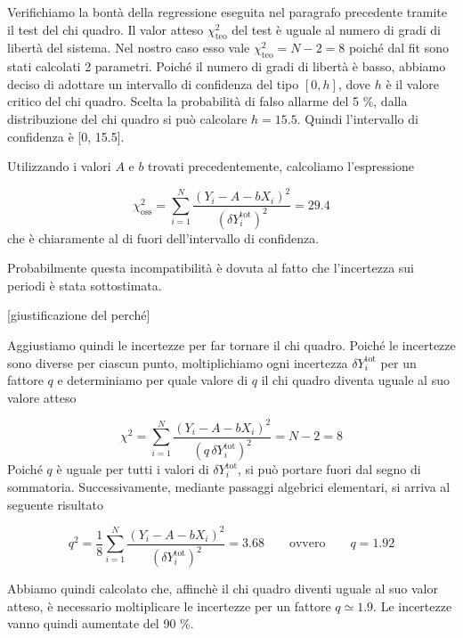 Verifichiamo la bontà della regressione eseguita nel paragrafo precedente tramite il test del chi quadro.
Il valor atteso $\chi^2_{\text{teo}}$ del test è uguale al numero di gradi di libertà del sistema. Nel nostro caso
esso vale $\chi^2_{\text{teo}} = N - 2 = 8$ poiché dal fit sono stati calcolati 2 parametri. Poiché
il numero di gradi di libertà è basso, abbiamo deciso di adottare un intervallo di confidenza del tipo $[0, h]$,
dove $h$ è il valore critico del chi quadro. Scelta la probabilità di falso allarme del 5 \%, dalla distribuzione
del chi quadro si può calcolare $h = 15.5$. Quindi l'intervallo di confidenza è [0, 15.5]. 

Utilizzando i valori $A$ e $b$ trovati precedentemente, calcoliamo l'espressione

\begin{equation}
    \chi^2_{\text{oss}} = \sum_{i=1}^N \frac{(Y_i - A - bX_i)^2}{(\delta Y_i^{\text{tot}})^2} = 29.4
\end{equation}
%
che è chiaramente al di fuori dell'intervallo di confidenza.

Probabilmente questa incompatibilità è dovuta al fatto che l'incertezza sui periodi è stata sottostimata.

[giustificazione del perché]

Aggiustiamo quindi le incertezze per far tornare il chi quadro. Poiché le incertezze sono diverse per ciascun punto,
moltiplichiamo ogni incertezza $\delta Y_i^{\text{tot}}$ per un fattore $q$ e determiniamo per quale valore di $q$
il chi quadro diventa uguale al suo valore atteso

\begin{equation}
    \chi^2 = \sum_{i=1}^N \frac{(Y_i - A - bX_i)^2}{(q\, \delta Y_i^{\text{tot}})^2} = N - 2 = 8
\end{equation}
%
Poiché $q$ è uguale per tutti i valori di $\delta Y_i^{\text{tot}}$, si può portare fuori dal segno di sommatoria.
Successivamente, mediante passaggi algebrici elementari, si arriva al seguente risultato

\begin{equation}
    q^2 = \frac{1}{8} \sum_{i=1}^N \frac{(Y_i - A - bX_i)^2}{(\delta Y_i^{\text{tot}})^2} = 3.68 \qquad \text{ovvero} \qquad q = 1.92
\end{equation}

Abbiamo quindi calcolato che, affinchè il chi quadro diventi uguale al suo valor atteso, è necessario moltiplicare
le incertezze per un fattore $q \simeq 1.9$. Le incertezze vanno quindi aumentate del 90 \%.

